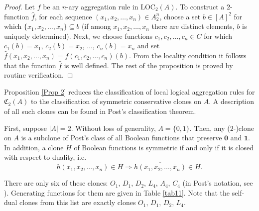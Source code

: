 \documentclass[graybox]{SNmult}
\theoremstyle{definition}
\begin{document}
\begin{proof}
	Let $f$ be an $n$-ary aggregation rule in $\mathrm{LOC}_2(A)$. To construct a $2$-function $\widehat f$, for each sequence $(x_1, x_2, \ldots, x_n)\in A^n_2$, choose a set $b\in [A]^2$ for which $\{x_1, x_2, \ldots, x_n\}\subseteq b$ (if among $x_1, x_2, \ldots, x_n$ there are distinct elements, $b$ is uniquely determined). Next, we choose functions $c_1, c_2, \ldots, c_n\in C$ for which $c_1(b)=x_1$, $c_2(b)=x_2$, $\ldots$, $c_n(b)=x_n$ and set $\widehat f(x_1, x_2, \ldots, x_n)= f(c_1, c_2, \ldots, c_n)(b)$. From the locality condition it follows that the function $\widehat f$ is well defined. The rest of the proposition is proved by routine verification.
\end{proof}
\par Proposition \ref{Prop 2} reduces the classification of local logical aggregation rules for $\mathfrak C_2(A)$ to the classification of symmetric conservative clones on $A$. A description of all such clones can be found in Post's classification theorem.
\par First, suppose $|A|=2$. Without loss of generality, $A=\{0,1\}$. Then, any ($2$-)clone on $A$ is a subclone of Post's class of all Boolean functions that preserve $\mathbf 0$ and $\mathbf 1$. In addition, a clone $H$ of Boolean functions is symmetric if and only if it is closed with respect to duality, i.e.
$$
h(x_1, x_2, \ldots, x_n)\in H\Rightarrow \overline{h(\overline x_1, \overline x_2, \ldots, \overline x_n)}\in H. %
$$
\par There are only six of these clones: $O_1$, $D_1$, $D_2$, $L_4$, $A_4$, $C_4$ (in Post's notation, see \cite{Post}). Generating functions for them are given in Table \ref{tab11}. Note that the self-dual clones from this list are exactly clones $O_1$, $D_1$, $D_2$, $L_4$.
\end{document}

